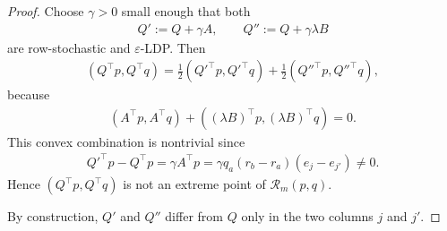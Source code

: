 \documentclass{article}
\theoremstyle{plain}
\theoremstyle{definition}
\theoremstyle{plain}
\begin{document}
\begin{proof}
Choose $\gamma>0$ small enough that both
\begin{align*}
    Q':=Q+\gamma A,
    \qquad
    Q'':=Q+\gamma \lambda B
\end{align*}
are row-stochastic and $\varepsilon$-LDP. Then
\begin{align*}
    (Q^\top p,Q^\top q)
    =
    \frac12(Q'^\top p,Q'^\top q)
    +
    \frac12(Q''^\top p,Q''^\top q),
\end{align*}
because
\begin{align*}
    (A^\top p,A^\top q)+((\lambda B)^\top p,(\lambda B)^\top q)=0.
\end{align*}
This convex combination is nontrivial since
\begin{align*}
    Q'^\top p-Q^\top p
    =
    \gamma A^\top p
    =
    \gamma q_a(r_b-r_a)(e_j-e_{j'})\neq 0.
\end{align*}
Hence $(Q^\top p,Q^\top q)$ is not an extreme point of $\mathcal{R}_m(p,q)$.

By construction, $Q'$ and $Q''$ differ from $Q$ only in the two columns $j$ and $j'$.
\end{proof}
\end{document}
